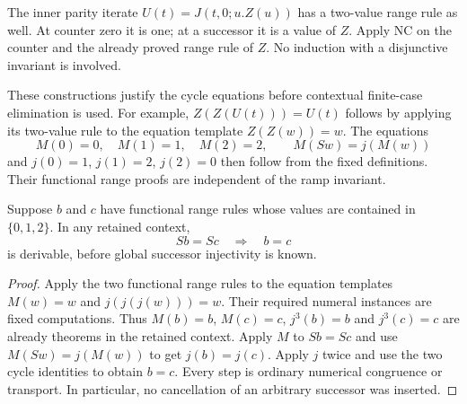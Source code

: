 The inner parity iterate $U(t)=J(t,0;u.Z(u))$ has a two-value range
rule as well.  At counter zero it is one; at a successor it is a value
of $Z$.  Apply NC on the counter and the already proved range rule of
$Z$.  No induction with a disjunctive invariant is involved.

These constructions justify the cycle equations before contextual
finite-case elimination is used.  For example, $Z(Z(U(t)))=U(t)$ follows
by applying its two-value rule to the equation template $Z(Z(w))=w$.
The equations
\[
 M(0)=0,\quad M(1)=1,\quad M(2)=2,\qquad M(Sw)=j(M(w))
\]
and $j(0)=1$, $j(1)=2$, $j(2)=0$ then follow from the fixed definitions.
Their functional range proofs are independent of the ramp invariant.

\begin{lemma}
\label{nb:finite-cancellation}
Suppose $b$ and $c$ have functional range rules whose values are contained
in $\{0,1,2\}$.  In any retained context,
\[
                         Sb=Sc\quad\Longrightarrow\quad b=c
\]
is derivable, before global successor injectivity is known.
\end{lemma}
\begin{proof}
Apply the two functional range rules to the equation templates
$M(w)=w$ and $j(j(j(w)))=w$.  Their required numeral instances are fixed
computations.  Thus $M(b)=b$, $M(c)=c$, $j^3(b)=b$ and $j^3(c)=c$
are already theorems in the retained context.
Apply $M$ to $Sb=Sc$ and use $M(Sw)=j(M(w))$ to get $j(b)=j(c)$.
Apply $j$ twice and use the two cycle identities to obtain $b=c$.
Every step is ordinary numerical congruence or transport.  In particular,
no cancellation of an arbitrary successor was inserted.
\end{proof}

